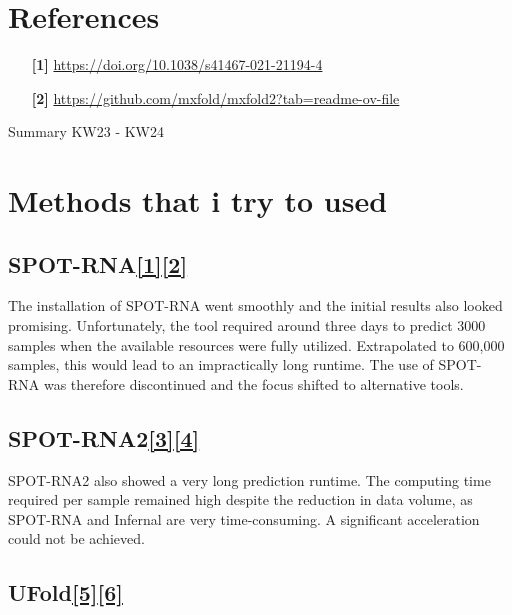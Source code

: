 \documentclass{article}
\begin{document}
\begin{large}
\begin{large}
\begin{large}
\section{References}
\begin{itemize}
    \item[\textbf{[1]}] \url{https://doi.org/10.1038/s41467-021-21194-4    } \par
    \item[\textbf{[2]}] \url{https://github.com/mxfold/mxfold2?tab=readme-ov-file} \par
\end{itemize}

Summary KW23 - KW24

\section{Methods that i try to used}

\subsection{{SPOT-RNA}\href{https://doi.org/10.1038/s41467-019-13395-9 }{\textbf{[1]}}\href{https://github.com/jaswindersingh2/SPOT-RNA}{\textbf{[2]}}}

The installation of SPOT-RNA went smoothly and the initial results also looked promising. Unfortunately, the tool required around three days to predict 3000 samples when the available resources were fully utilized. Extrapolated to 600,000 samples, this would lead to an impractically long runtime. The use of SPOT-RNA was therefore discontinued and the focus shifted to alternative tools.

\subsection{{SPOT-RNA2}\href{https://doi.org/10.1093/bioinformatics/btab165}{\textbf{[3]}}\href{https://github.com/jaswindersingh2/SPOT-RNA2}{\textbf{[4]}}}

SPOT-RNA2 also showed a very long prediction runtime. The computing time required per sample remained high despite the reduction in data volume, as SPOT-RNA and Infernal are very time-consuming. A significant acceleration could not be achieved.

\subsection{{UFold}\href{https://doi.org/10.1093/nar/gkab1074}{\textbf{[5]}}\href{https://github.com/uci-cbcl/UFold}{\textbf{[6]}}}


\end{large}
\end{large}
\end{large}
\end{document}
